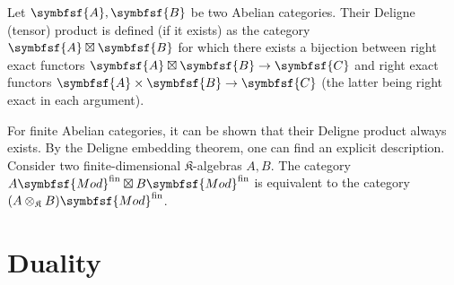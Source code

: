     \begin{construct}
        Let $\symbfsf{A},\symbfsf{B}$ be two Abelian categories. Their Deligne (tensor) product is defined (if it exists) as the category $\symbfsf{A}\boxtimes\symbfsf{B}$ for which there exists a bijection between right exact functors $\symbfsf{A}\boxtimes\symbfsf{B}\rightarrow\symbfsf{C}$ and right exact functors $\symbfsf{A}\times\symbfsf{B}\rightarrow\symbfsf{C}$ (the latter being right exact in each argument).

        For finite Abelian categories, it can be shown that their Deligne product always exists. By the Deligne embedding theorem, one can find an explicit description. Consider two finite-dimensional $\mathfrak{K}$-algebras $A,B$. The category $A\symbfsf{Mod}^{\text{fin}}\boxtimes B\symbfsf{Mod}^{\text{fin}}$ is equivalent to the category $(A\otimes_{\mathfrak{K}}B)\symbfsf{Mod}^{\text{fin}}$.
    \end{construct}

\section{Duality}\label{section:duality}


